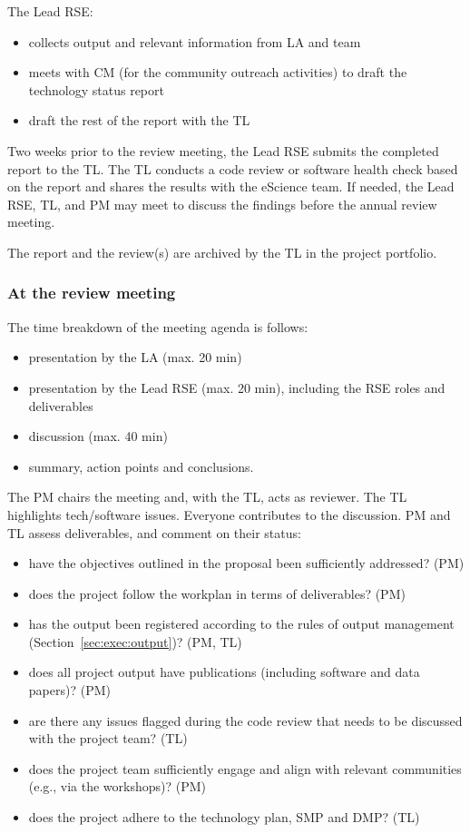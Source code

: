 The Lead RSE:
\begin{itemize}\itemsep0em
\item collects output and relevant information from LA and team
\item meets with CM (for the community outreach activities) to draft the technology status report  
\item draft the rest of the report with the TL
\end{itemize}

Two weeks prior to the review meeting, the Lead RSE submits the completed report to the TL. The TL conducts a code 
review or software health check based on the report and shares the results with the eScience team. If needed, 
the Lead RSE, TL, and PM may meet to discuss the findings before the annual review meeting.

The report and the review(s) are archived by the TL in the project portfolio.

\subsubsection{At the review meeting}
The time breakdown of the meeting agenda is follows:
\begin{itemize}\itemsep0em
\item presentation by the LA (max. 20 min)
\item presentation by the Lead RSE (max. 20 min), including the RSE roles and deliverables
\item discussion (max. 40 min)
\item summary, action points and conclusions.
\end{itemize}

The PM chairs the meeting and, with the TL, acts as reviewer. The TL highlights tech/software issues. Everyone contributes to the discussion. PM and TL assess deliverables, and comment on their status:
\begin{itemize}\itemsep0em
\item have the objectives outlined in the proposal been sufficiently addressed? (PM)
\item does the project follow the workplan in terms of deliverables? (PM)
\item has the output been registered according to the rules of output management (Section~\ref{sec:exec:output})? (PM, TL)
\item does all project output have publications (including software and data papers)? (PM)
\item are there any issues flagged during the code review that needs to be discussed with the project team? (TL)
\item does the project team sufficiently engage and align with relevant communities (e.g., via the workshops)? (PM)
\item does the project adhere to the technology plan, SMP and DMP? (TL)
\end{itemize}

